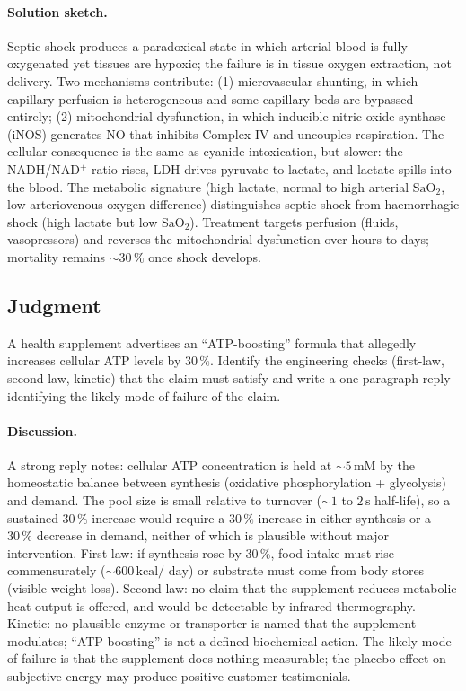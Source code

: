 \paragraph{Solution sketch.}
Septic shock produces a paradoxical state in which arterial blood is
fully oxygenated yet tissues are hypoxic; the failure is in tissue
oxygen extraction, not delivery. Two mechanisms contribute: (1)
microvascular shunting, in which capillary perfusion is heterogeneous
and some capillary beds are bypassed entirely; (2) mitochondrial
dysfunction, in which inducible nitric oxide synthase (iNOS) generates
NO that inhibits Complex IV and uncouples respiration. The cellular
consequence is the same as cyanide intoxication, but slower: the
NADH/NAD$^+$ ratio rises, LDH drives pyruvate to lactate, and lactate
spills into the blood. The metabolic signature (high lactate, normal
to high arterial $\text{SaO}_2$, low arteriovenous oxygen difference)
distinguishes septic shock from haemorrhagic shock (high lactate but
low $\text{SaO}_2$). Treatment targets perfusion (fluids,
vasopressors) and reverses the mitochondrial dysfunction over hours
to days; mortality remains $\sim 30\,\%$ once shock develops.

\subsection*{Judgment}

\begin{exercise}
A health supplement advertises an ``ATP-boosting'' formula that
allegedly increases cellular ATP levels by $30\,\%$. Identify the
engineering checks (first-law, second-law, kinetic) that the claim
must satisfy and write a one-paragraph reply identifying the likely
mode of failure of the claim.
\end{exercise}

\paragraph{Discussion.}
A strong reply notes: cellular ATP concentration is held at $\sim
5\,\text{mM}$ by the homeostatic balance between synthesis (oxidative
phosphorylation + glycolysis) and demand. The pool size is small
relative to turnover ($\sim 1$ to $2\,\text{s}$ half-life), so a
sustained $30\,\%$ increase would require a $30\,\%$ increase in
either synthesis or a $30\,\%$ decrease in demand, neither of which
is plausible without major intervention. First law: if synthesis rose
by $30\,\%$, food intake must rise commensurately ($\sim 600\,\text{kcal/
day}$) or substrate must come from body stores (visible weight
loss). Second law: no claim that the supplement reduces metabolic
heat output is offered, and would be detectable by infrared
thermography. Kinetic: no plausible enzyme or transporter is named
that the supplement modulates; ``ATP-boosting'' is not a defined
biochemical action. The likely mode of failure is that the
supplement does nothing measurable; the placebo effect on subjective
energy may produce positive customer testimonials.


